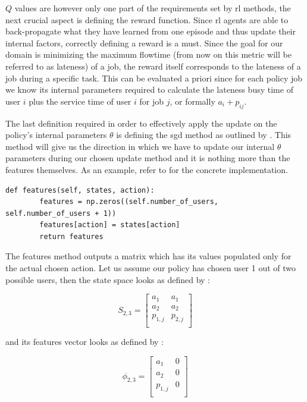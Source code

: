 \documentclass{seal_thesis}
\begin{document}
 $Q$ values are however only one part of the requirements set by \gls{rl} methods, the next crucial aspect is defining the reward function. Since \gls{rl} agents are able to back-propagate what they have learned from one episode and thus update their internal factors, correctly defining a reward is a must. Since the goal for our domain is minimizing the maximum flowtime (from now on this metric will be referred to as lateness) of a job, the reward itself corresponds to the lateness of a job during a specific task. This can be evaluated a priori since for each policy job we know its internal parameters required to calculate the lateness \ie busy time of user $i$ plus the service time of user $i$ for job $j$, or formally $a_i+p_{ij}$.

 The last definition required in order to effectively apply the update on the policy's internal parameters $\theta$ is defining the \gls{sgd} method as outlined by . This method will give us the direction in which we have to update our internal $\theta$ parameters during our chosen update method and it is nothing more than the features themselves. As an example, refer to  for the concrete implementation.

 \begin{lstlisting}[caption=Features definition,label=lst:features_definition,style=CustomPython]
    def features(self, states, action):
        features = np.zeros((self.number_of_users, self.number_of_users + 1))
        features[action] = states[action]
        return features
\end{lstlisting}

The features method outputs a matrix which has its values populated only for the actual chosen action. Let us assume our policy has chosen user 1 out of two possible users, then the state space looks as defined by :

\begin{equation}
\label{eq:kbatch_sp_ex}
	S_{2,3} = 
	\begin{bmatrix}
	a_1 & a_1 \\
	a_2 & a_2 \\
	p_{1,j} & p_{2,j} \\
	\end{bmatrix}
\end{equation}

and its features vector looks as defined by :

\begin{equation}
\label{eq:kbatch_features_ex}
	\phi_{2,3} = 
	\begin{bmatrix}
	a_1 & 0 \\
	a_2 & 0 \\
	p_{1,j} & 0 \\
	\end{bmatrix}
\end{equation}
\end{document}
